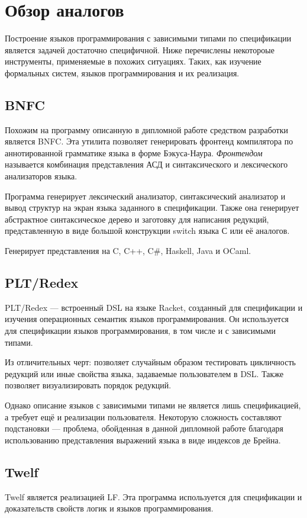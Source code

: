 \section{Обзор аналогов}
Построение языков программирования с зависимыми типами по спецификации является задачей достаточно специфичной. Ниже перечислены некотороые инструменты, применяемые в похожих ситуациях. Таких, как изучение формальных систем, языков программирования и их реализация.

\subsection{BNFC}
Похожим на программу описанную в дипломной работе средством разработки является BNFC\cite{bnfc}. Эта утилита позволяет генерировать фронтенд компилятора по аннотированной грамматике языка в форме Бэкуса-Наура\cite{lbnf}. \textit{Фронтендом} называется комбинация представления АСД и синтаксического и лексического анализаторов языка.

Программа генерирует лексический анализатор, синтаксический анализатор и вывод структур на экран языка заданного в спецификации. Также она генерирует абстрактное синтаксическое дерево и заготовку для написания редукций, представленную в виде большой конструкции switch языка С или её аналогов.

Генерирует представления на C, C++, C\#, Haskell, Java и OCaml.

\subsection{PLT/Redex}
PLT/Redex\cite{plt:redex} --- встроенный DSL на языке Racket, созданный для спецификации и изучения операционных семантик языков программирования. Он используется для спецификации языков программирования, в том числе и с зависимыми типами.

Из отличительных черт: позволяет случайным образом тестировать цикличность редукций или иные свойства языка, задаваемые пользователем в DSL. Также позволяет визуализировать порядок редукций.

Однако описание языков с зависимыми типами не является лишь спецификацией, а требует ещё и реализации пользователя\cite{plt:ex}. Некоторую сложность составляют подстановки --- проблема, обойденная в данной дипломной работе благодаря использованию представления выражений языка в виде индексов де Брейна.

\subsection{Twelf}
Twelf\cite{twelf} является реализацией LF\cite{Pfenning2002}. Эта программа используется для спецификации и доказательств свойств логик и языков программирования.

